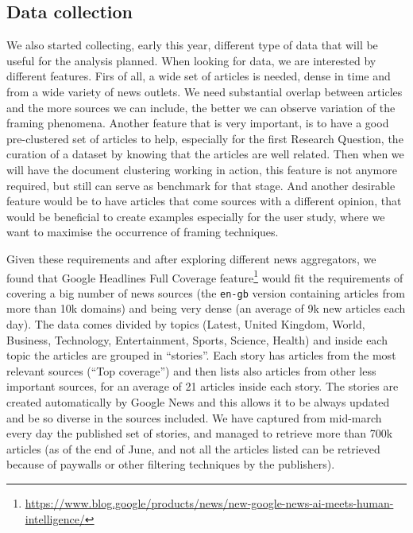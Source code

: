 \subsection{Data collection}
We also started collecting, early this year, different type of data that will be useful for the analysis planned.
When looking for data, we are interested by different features.
Firs of all, a wide set of articles is needed, dense in time and from a wide variety of news outlets. We need substantial overlap between articles and the more sources we can include, the better we can observe variation of the framing phenomena.
Another feature that is very important, is to have a good pre-clustered set of articles to help, especially for the first Research Question, the curation of a dataset by knowing that the articles are well related. Then when we will have the document clustering working in action, this feature is not anymore required, but still can serve as benchmark for that stage.
And another desirable feature would be to have articles that come sources with a different opinion, that would be beneficial to create examples especially for the user study, where we want to maximise the occurrence of framing techniques. 

Given these requirements and after exploring different news aggregators, we found that Google Headlines Full Coverage feature\footnote{\url{https://www.blog.google/products/news/new-google-news-ai-meets-human-intelligence/}} would fit the requirements of covering a big number of news sources (the \texttt{en-gb} version containing articles from more than 10k domains) and being very dense (an average of 9k new articles each day).
The data comes divided by topics (Latest, United Kingdom, World, Business, Technology, Entertainment, Sports, Science, Health) and inside each topic the articles are grouped in ``stories''. Each story has articles from the most relevant sources (``Top coverage'') and then lists also articles from other less important sources, for an average of 21 articles inside each story.
The stories are created automatically by Google News and this allows it to be always updated and be so diverse in the sources included.
We have captured from mid-march every day the published set of stories, and managed to retrieve more than 700k articles (as of the end of June, and not all the articles listed can be retrieved because of paywalls or other filtering techniques by the publishers).

